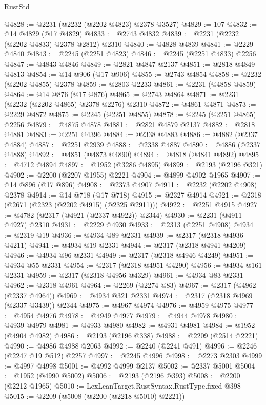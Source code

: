 \begin{lexlean}{RustStd}
\begin{coremodule}
@4828 := @2231 (@2232 (@2202 @4823) @2378 @3527)
@4829 := 107
@4832 := @14 @4829 (@17 @4829)
@4833 := @2743 @4832
@4839 := @2231 (@2232 (@2202 @4833) @2378 @2812) @2310
@4840 := @4828 @4839
@4841 := @2229 @4840
@4843 := @2245 (@2251 @4823)
@4846 := @2245 (@2251 @4833) @2256
@4847 := @4843 @4846
@4849 := @2821 @4847 @2137
@4851 := @2818 @4849 @4813
@4854 := @14 @906 (@17 @906)
@4855 := @2743 @4854
@4858 := @2232 (@2202 @4855) @2378
@4859 := @2803 @2233
@4861 := @2231 (@4858 @4859)
@4864 := @14 @876 (@17 @876)
@4865 := @2743 @4864
@4871 := @2231 (@2232 (@2202 @4865) @2378 @2276) @2310
@4872 := @4861 @4871
@4873 := @2229 @4872
@4875 := @2245 (@2251 @4855)
@4878 := @2245 (@2251 @4865) @2256
@4879 := @4875 @4878
@4881 := @2821 @4879 @2137
@4882 := @2818 @4881
@4883 := @2251 @4396
@4884 := @2338 @4883
@4886 := @4882 (@2337 @4884)
@4887 := @2251 @2939
@4888 := @2338 @4887
@4890 := @4886 (@2337 @4888)
@4892 := @4851 (@4873 @4890)
@4894 := @4818 (@4841 @4892)
@4895 := @4712 @4894
@4897 := @1952 (@3286 @4895)
@4899 := @2193 (@2196 @321)
@4902 := @2200 (@2207 @1955) @2221
@4904 := @4899 @4902 @1965
@4907 := @14 @896 (@17 @896)
@4908 := @2373 @4907
@4911 := @2232 (@2202 @4908) @2378
@4914 := @14 @718 (@17 @718)
@4915 := @2327 @4914
@4921 := @2318 (@2671 (@2323 (@2202 @4915) (@2325 @2911)))
@4922 := @2251 @4915
@4927 := @4782 (@2317 (@4921 (@2337 @4922)) @2344)
@4930 := @2231 (@4911 @4927) @2310
@4931 := @2229 @4930
@4933 := @2313 (@2251 @4908)
@4934 := @2319 @19
@4936 := @4934 @89 @2331
@4939 := @2317 (@2318 @4936 @4211)
@4941 := @4934 @19 @2331
@4944 := @2317 (@2318 @4941 @4209)
@4946 := @4934 @96 @2331
@4949 := @2317 (@2318 @4946 @4249)
@4951 := @4934 @55 @2331
@4954 := @2317 (@2318 @4951 @4290)
@4956 := @4934 @161 @2331
@4959 := @2317 (@2318 @4956 @4329)
@4961 := @4934 @83 @2331
@4962 := @2318 @4961
@4964 := @2269 (@2274 @83)
@4967 := @2317 (@4962 (@2337 @4964))
@4969 := @4934 @321 @2331
@4974 := @2317 (@2318 @4969 (@2337 @3439)) @2344
@4975 := @4967 @4974
@4976 := @4959 @4975
@4977 := @4954 @4976
@4978 := @4949 @4977
@4979 := @4944 @4978
@4980 := @4939 @4979
@4981 := @4933 @4980
@4982 := @4931 @4981
@4984 := @1952 (@4904 @4982)
@4986 := @2193 (@2196 @338)
@4988 := @2209 (@2514 @2221)
@4990 := @4986 @4988 @2063
@4992 := @2240 (@2241 @491)
@4996 := @2246 (@2247 @19 @512) @2257
@4997 := @2245 @4996
@4998 := @2273 @2303
@4999 := @4997 @4998
@5001 := @4992 @4999 @2137
@5002 := @2337 @5001
@5004 := @1952 (@4990 @5002)
@5006 := @2193 (@2196 @393)
@5008 := @2200 (@2212 @1965)
@5010 := LexLeanTarget.RustSyntax.RustType.fixed @398
@5015 := @2209 (@5008 (@2200 (@2218 @5010) @2221))

\end{coremodule}
\end{lexlean}
